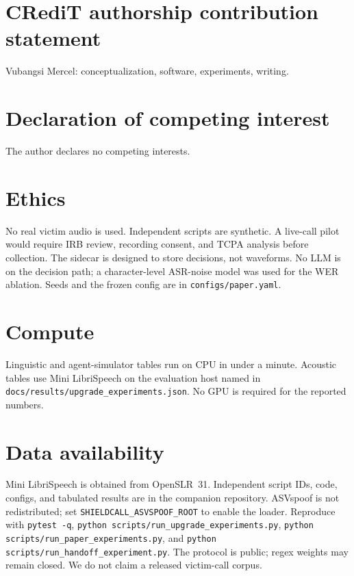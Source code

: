 \documentclass[11pt]{article}
\begin{document}
\section*{CRediT authorship contribution statement}
Vubangsi Mercel: conceptualization, software, experiments, writing.

\section*{Declaration of competing interest}
The author declares no competing interests.

\section*{Ethics}
No real victim audio is used. Independent scripts are synthetic. A live-call pilot would require IRB review, recording consent, and TCPA analysis before collection. The sidecar is designed to store decisions, not waveforms. No LLM is on the decision path; a character-level ASR-noise model was used for the WER ablation. Seeds and the frozen config are in \texttt{configs/paper.yaml}.

\section*{Compute}
Linguistic and agent-simulator tables run on CPU in under a minute. Acoustic tables use Mini LibriSpeech on the evaluation host named in \texttt{docs/results/upgrade\_experiments.json}. No GPU is required for the reported numbers.

\section*{Data availability}
Mini LibriSpeech is obtained from OpenSLR~31. Independent script IDs, code, configs, and tabulated results are in the companion repository. ASVspoof is not redistributed; set \texttt{SHIELDCALL\_ASVSPOOF\_ROOT} to enable the loader. Reproduce with \texttt{pytest -q}, \texttt{python scripts/run\_upgrade\_experiments.py}, \texttt{python scripts/run\_paper\_experiments.py}, and \texttt{python scripts/run\_handoff\_experiment.py}. The protocol is public; regex weights may remain closed. We do not claim a released victim-call corpus.



\end{document}
